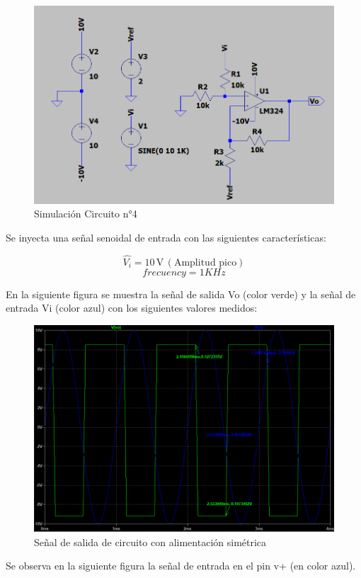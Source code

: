 \begin{figure}[H]
    \centering
    \includegraphics[width=0.8\linewidth]{Circuito4.png}
    \caption{Simulación Circuito n°4}
    \label{fig:enter-label}
\end{figure}
Se inyecta una señal senoidal de entrada con las siguientes características:

\[ \widehat{V_i} = 10 \, \text{V} \, (\text{Amplitud pico}) \]
\[frecuency= 1KHz\]

En la siguiente figura se muestra la señal de salida Vo (color verde)  y la señal de entrada Vi (color azul) con los siguientes valores medidos:
\begin{figure}[H]
    \centering
    \includegraphics[width=1.0\linewidth]{Secciones/Circuito4/Circuito 4 - Simulación con alimentación simétrica.png}
    \caption{Señal de salida de circuito con alimentación simétrica}
    \label{fig:SimulacionConAlimentacionSimetrica}
\end{figure}

Se observa en la siguiente figura la señal de entrada en el pin v+ (en color azul).

